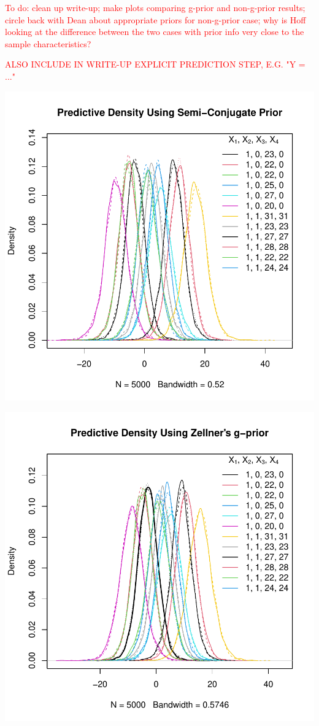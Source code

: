 \documentclass[12pt, a4paper]{article}
\begin{document}
\textcolor{red}{To do:  clean up write-up; make plots comparing g-prior and non-g-prior results;  circle back with Dean about appropriate priors for non-g-prior case; why is Hoff looking at the difference between the two cases with prior info very close to the sample characteristics? }

\textcolor{red}{ALSO INCLUDE IN WRITE-UP EXPLICIT PREDICTION STEP, E.G. "Y = ..."}

\includegraphics{Thesis-015}




\includegraphics{Thesis-016}
\end{document}
